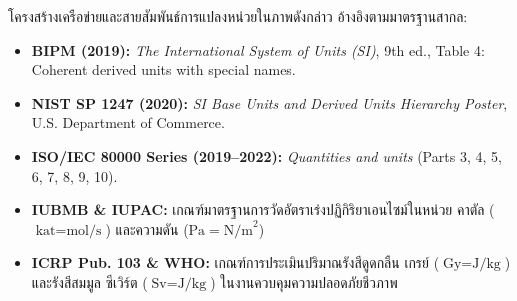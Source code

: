 \begin{conceptbox}
\footnotesize
โครงสร้างเครือข่ายและสายสัมพันธ์การแปลงหน่วยในภาพดังกล่าว อ้างอิงตามมาตรฐานสากล:
\begin{itemize}[leftmargin=1.5em, itemsep=1pt]
    \item \textbf{BIPM (2019):} \textit{The International System of Units (SI)}, 9th ed., Table 4: Coherent derived units with special names.
    \item \textbf{NIST SP 1247 (2020):} \textit{SI Base Units and Derived Units Hierarchy Poster}, U.S. Department of Commerce.
    \item \textbf{ISO/IEC 80000 Series (2019--2022):} \textit{Quantities and units} (Parts 3, 4, 5, 6, 7, 8, 9, 10).
    \item \textbf{IUBMB \& IUPAC:} เกณฑ์มาตรฐานการวัดอัตราเร่งปฏิกิริยาเอนไซม์ในหน่วย คาตัล ($\text{kat} = \text{mol/s}$) และความดัน ($\text{Pa} = \text{N/m}^2$)
    \item \textbf{ICRP Pub. 103 \& WHO:} เกณฑ์การประเมินปริมาณรังสีดูดกลืน เกรย์ ($\text{Gy} = \text{J/kg}$) และรังสีสมมูล ซีเวิร์ต ($\text{Sv} = \text{J/kg}$) ในงานควบคุมความปลอดภัยชีวภาพ
\end{itemize}
\end{conceptbox}



